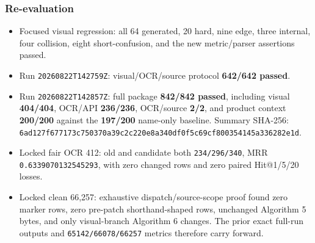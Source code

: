 \subsubsection{Re-evaluation}\label{re-evaluation}

\begin{itemize}
\tightlist
\item
  Focused visual regression: all 64 generated, 20 hard, nine edge, three
  internal, four collision, eight short-confusion, and the new metric/parser
  assertions passed.
\item
  Run \texttt{20260822T142759Z}: visual/OCR/source protocol \textbf{642/642 passed}.
\item
  Run \texttt{20260822T142857Z}: full package \textbf{842/842 passed}, including visual
  \textbf{404/404}, OCR/API \textbf{236/236}, OCR/source \textbf{2/2}, and product context
  \textbf{200/200} against the \textbf{197/200} name-only baseline. Summary SHA-256:
  \texttt{6ad127f677173c750370a39c2c220e8a340df0f5c69cf800354145a336282e1d}.
\item
  Locked fair OCR 412: old and candidate both \texttt{234/296/340}, MRR
  \texttt{0.6339070132545293}, with zero changed rows and zero paired Hit@1/5/20
  losses.
\item
  Locked clean 66,257: exhaustive dispatch/source-scope proof found zero marker
  rows, zero pre-patch shorthand-shaped rows, unchanged Algorithm 5 bytes, and
  only visual-branch Algorithm 6 changes. The prior exact full-run outputs and
  \texttt{65142/66078/66257} metrics therefore carry forward.
\end{itemize}
